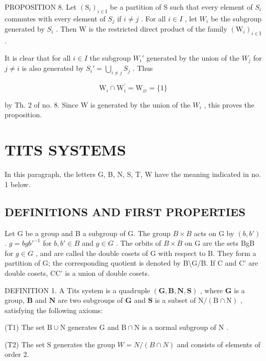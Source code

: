 PROPOSITION 8. Let \((\mathrm{S}_{i})_{i\in\mathrm{I}}\) be a partition of S such that every element of \(S_{i}\) commutes with every element of \(S_{j}\) if \(i\neq j\) . For all \(i\in I\) , let \(W_{i}\) be the subgroup generated by \(S_{i}\) . Then W is the restricted direct product of the family \((\mathrm{W}_{i})_{i\in\mathrm{I}}\) .

It is clear that for all \(i \in I\) the subgroup \(W_i'\) generated by the union of the \(W_j\) for \(j \neq i\) is also generated by \(S_i' = \bigcup_{i \neq j} S_j\) . Thus

\[
\mathrm{W} _ {i} \cap \mathrm{W} _ {i} ^ {\prime} = \mathrm{W} _ {\varnothing} = \{1 \}
\]

by Th. 2 of no. 8. Since W is generated by the union of the \(W_{i}\) , this proves the proposition.

\section{TITS SYSTEMS}

In this paragraph, the letters G, B, N, S, T, W have the meaning indicated in no. 1 below.

\subsection{DEFINITIONS AND FIRST PROPERTIES}

Let G be a group and B a subgroup of G. The group \(B \times B\) acts on G by \((b, b')\) . \(g = bgb'^{-1}\) for \(b, b' \in B\) and \(g \in G\) . The orbits of \(B \times B\) on G are the sets BgB for \(g \in G\) , and are called the double cosets of G with respect to B. They form a partition of G; the corresponding quotient is denoted by B\textbackslash G/B. If C and C' are double cosets, CC' is a union of double cosets.

DEFINITION 1. A Tits system is a quadruple \((\mathbf{G},\mathbf{B},\mathbf{N},\mathbf{S})\) , where \(\mathbf{G}\) is a group, \(\mathbf{B}\) and \(\mathbf{N}\) are two subgroups of \(\mathbf{G}\) and \(\mathbf{S}\) is a subset of \(\mathrm{N} / (\mathrm{B}\cap \mathrm{N})\) , satisfying the following axioms:

(T1) The set \(\mathrm{B} \cup \mathrm{N}\) generates \(\mathrm{G}\) and \(\mathrm{B} \cap \mathrm{N}\) is a normal subgroup of \(\mathrm{N}\) .

(T2) The set S generates the group \(W = N/(B \cap N)\) and consists of elements of order 2.

